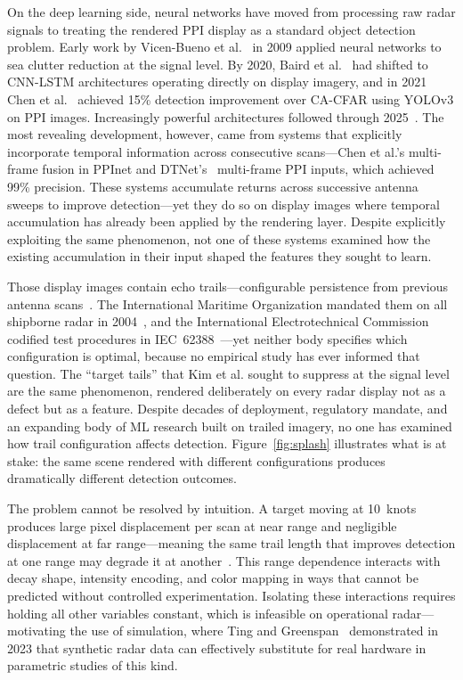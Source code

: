 \documentclass[colorlinks,upint,balance]{asmeconf}
\begin{document}
On the deep learning side, neural networks have moved from processing raw radar signals to treating the rendered PPI display as a standard object detection problem. Early work by Vicen-Bueno et al.~\cite{VicenBueno2009Neural} in 2009 applied neural networks to sea clutter reduction at the signal level. By 2020, Baird et al.~\cite{Baird2020CNNLSTM} had shifted to CNN-LSTM architectures operating directly on display imagery, and in 2021 Chen et al.~\cite{Chen2021PPInet} achieved 15\% detection improvement over CA-CFAR using YOLOv3 on PPI images. Increasingly powerful architectures followed through 2025~\cite{Wang2023SALALSTM, Yin2023SWFormer, Jia2025YOLOv11OBB}. The most revealing development, however, came from systems that explicitly incorporate temporal information across consecutive scans---Chen et al.'s multi-frame fusion in PPInet and DTNet's~\cite{DTNet2025MultiFrame} multi-frame PPI inputs, which achieved 99\% precision. These systems accumulate returns across successive antenna sweeps to improve detection---yet they do so on display images where temporal accumulation has already been applied by the rendering layer. Despite explicitly exploiting the same phenomenon, not one of these systems examined how the existing accumulation in their input shaped the features they sought to learn.

Those display images contain echo trails---configurable persistence from previous antenna scans~\cite{Briggs2004RadarDisplay}. The International Maritime Organization mandated them on all shipborne radar in 2004~\cite{IMO2004MSC192}, and the International Electrotechnical Commission codified test procedures in IEC~62388~\cite{IEC2013Radar}---yet neither body specifies which configuration is optimal, because no empirical study has ever informed that question. The ``target tails'' that Kim et al. sought to suppress at the signal level are the same phenomenon, rendered deliberately on every radar display not as a defect but as a feature. Despite decades of deployment, regulatory mandate, and an expanding body of ML research built on trailed imagery, no one has examined how trail configuration affects detection. Figure~\ref{fig:splash} illustrates what is at stake: the same scene rendered with different configurations produces dramatically different detection outcomes.

The problem cannot be resolved by intuition. A target moving at 10~knots produces large pixel displacement per scan at near range and negligible displacement at far range---meaning the same trail length that improves detection at one range may degrade it at another~\cite{Chen2022VisibilityGraph}. This range dependence interacts with decay shape, intensity encoding, and color mapping in ways that cannot be predicted without controlled experimentation. Isolating these interactions requires holding all other variables constant, which is infeasible on operational radar---motivating the use of simulation, where Ting and Greenspan~\cite{Ting2023SyntheticRadar} demonstrated in 2023 that synthetic radar data can effectively substitute for real hardware in parametric studies of this kind.
\end{document}

